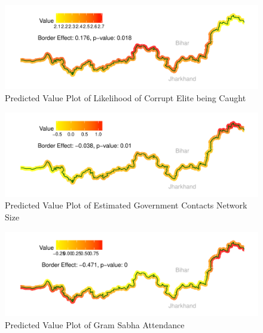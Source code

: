 \documentclass[xcolor=x11names,compress]{beamer}\usepackage[]{graphicx}\usepackage[]{color}
\makeatletter
\def\maxwidth{ %
  \ifdim\Gin@nat@width>\linewidth
    \linewidth
  \else
    \Gin@nat@width
  \fi
}
\renewcommand{\(}{\begin{columns}}
\renewcommand{\)}{\end{columns}}
\newcommand{\<}[1]{\begin{column}{#1}}
\renewcommand{\>}{\end{column}}
\makeatother
\begin{document}
\begin{frame}
\begin{figure}
\includegraphics[width=\maxwidth]{figure/rdd_map_accountability_elite-1} \caption[Predicted Value Plot of Likelihood of Corrupt Elite being Caught]{Predicted Value Plot of Likelihood of Corrupt Elite being Caught}\label{fig:rdd_map_accountability_elite}
\end{figure}
\end{frame}

\begin{frame}
\begin{figure}
\includegraphics[width=\maxwidth]{figure/rdd_map_net_government_size-1} \caption[Predicted Value Plot of Estimated Government Contacts Network Size]{Predicted Value Plot of Estimated Government Contacts Network Size}\label{fig:rdd_map_net_government_size}
\end{figure}
\end{frame}

\begin{frame}
\begin{figure}
\includegraphics[width=\maxwidth]{figure/rdd_map_sabha_att-1} \caption[Predicted Value Plot of Gram Sabha Attendance]{Predicted Value Plot of Gram Sabha Attendance}\label{fig:rdd_map_sabha_att}
\end{figure}
\end{frame}
\end{document}
